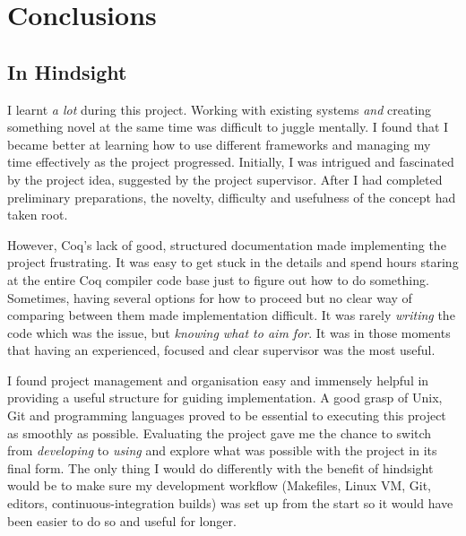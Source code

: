 \chapter{Conclusions}

%

\section{In Hindsight}

I learnt \emph{a lot} during this project.  Working with existing systems
\emph{and} creating something novel at the same time was difficult to juggle
mentally. I found that I became better at learning how to use different
frameworks and managing my time effectively as the project progressed.
Initially, I was intrigued and fascinated by the project idea, suggested by the
project supervisor. After I had completed preliminary preparations, the novelty,
difficulty and usefulness of the concept had taken root.

However, Coq's lack of good, structured documentation made implementing the
project frustrating.  It was easy to get stuck in the details and spend hours
staring at the entire Coq compiler code base just to figure out how to do
something.  Sometimes, having several options for how to proceed but no clear
way of comparing between them made implementation difficult. It was rarely
\emph{writing} the code which was the issue, but \emph{knowing what to aim for}.
It was in those moments that having an experienced, focused and clear supervisor
was the most useful.

I found project management and organisation easy and immensely helpful in
providing a useful structure for guiding implementation. A good grasp of Unix,
Git and programming languages proved to be essential to executing this project
as smoothly as possible. Evaluating the project gave me the chance to switch
from \emph{developing} to \emph{using} and explore what was possible with the
project in its final form. The only thing I would do differently with the
benefit of hindsight would be to make sure my development workflow (Makefiles,
Linux VM, Git, editors, continuous-integration builds) was set up from the start
so it would have been easier to do so and useful for longer.

